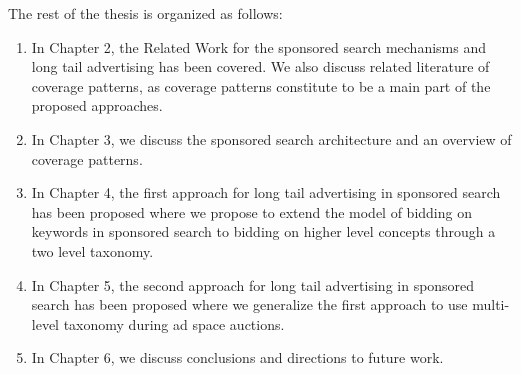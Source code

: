 The rest of the thesis is organized as follows:
\begin{enumerate}[label=(\roman*).]

\item In Chapter 2, the Related Work for the sponsored search mechanisms and long tail advertising has been covered. We also discuss related literature of coverage patterns, as coverage patterns constitute to be a main part of the proposed approaches.

\item In Chapter 3, we discuss the sponsored search architecture and an overview of coverage patterns.

\item In Chapter 4, the first approach for long tail advertising in sponsored search has been proposed where we propose to extend the model of bidding on keywords in sponsored search to bidding on higher level concepts through a two level taxonomy.

\item In Chapter 5, the second approach for long tail advertising in sponsored search  has been proposed where we generalize the first approach to use multi-level taxonomy during ad space auctions.

\item In Chapter 6, we discuss conclusions and directions to future work.

\end{enumerate}

